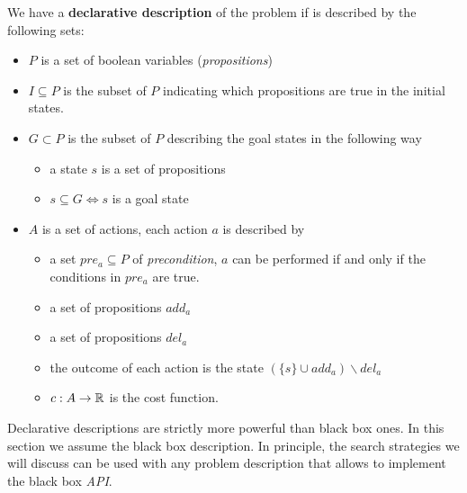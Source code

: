\documentclass[10pt, letterpaper]{report}
\begin{document}
We have a \textbf{declarative description} of the problem if is described by the following sets:\begin{itemize}
    \item $P$ is a set of boolean variables (\textit{propositions})
    \item $I\subseteq P$ is the subset of $P$ indicating which propositions are true in the initial states.
    \item $G\subset P$ is the subset of $P$ describing the goal states in the following way\begin{itemize}
        \item a state $s$ is a set of propositions 
        \item $s\subseteq G \iff s$ is a goal state
    \end{itemize}
    \item $A$ is a set of actions, each action $a$ is described by\begin{itemize}
        \item a set $pre_a\subseteq P$ of \textit{precondition}, $a$ can be performed if and only if the conditions in $pre_a$ are true.
        \item a set of propositions $add_a$
        \item a set of propositions $del_a$
        \item the outcome of each action is the state $(\{s\}\cup add_a )\backslash del_a$
        \item $c:A\rightarrow{\mathbb R}$ is the cost function.
    \end{itemize}
\end{itemize}
Declarative descriptions are strictly more powerful than black box ones. In this section we assume the black box description. In principle, the search strategies we will discuss can be used with any
problem description that allows to implement the black box \textit{API}.
\end{document}
